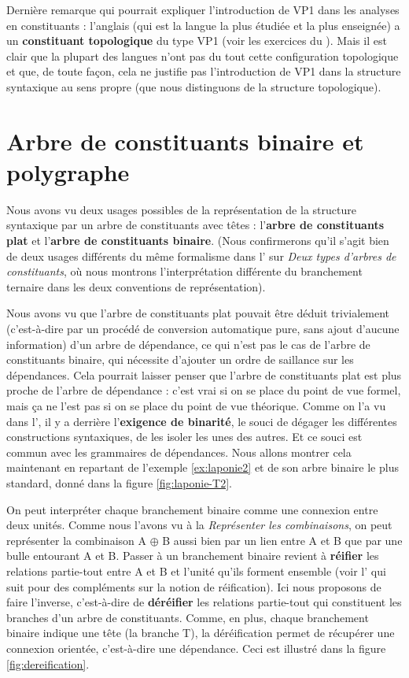 {    Dernière remarque qui pourrait expliquer l’introduction de VP1 dans les analyses en constituants : l’anglais (qui est la langue la plus étudiée et la plus enseignée) a un \textbf{constituant topologique} du type VP1 (voir les exercices du ). Mais il est clair que la plupart des langues n’ont pas du tout cette configuration topologique et que, de toute façon, cela ne justifie pas l’introduction de VP1 dans la structure syntaxique au sens propre (que nous distinguons de la structure topologique).
}
\section{Arbre de constituants binaire et polygraphe}\label{sec:3.4.21}

Nous avons vu deux usages possibles de la représentation de la structure syntaxique par un arbre de constituants avec têtes : l’\textbf{arbre de constituants plat} et l’\textbf{arbre de constituants binaire}. (Nous confirmerons qu’il s’agit bien de deux usages différents du même formalisme dans l’ sur \textit{Deux types d’arbres de constituants}, où nous montrons l’interprétation différente du branchement ternaire dans les deux conventions de représentation).

Nous avons vu que l’arbre de constituants plat pouvait être déduit trivialement (c’est-à-dire par un procédé de conversion automatique pure, sans ajout d’aucune information) d’un arbre de dépendance, ce qui n’est pas le cas de l’arbre de constituants binaire, qui nécessite d’ajouter un ordre de saillance sur les dépendances. Cela pourrait laisser penser que l’arbre de constituants plat est plus proche de l’arbre de dépendance : c’est vrai si on se place du point de vue formel, mais ça ne l’est pas si on se place du point de vue théorique. Comme on l’a vu dans l', il y a derrière l’\textbf{exigence de binarité}, le souci de dégager les différentes constructions syntaxiques, de les isoler les unes des autres. Et ce souci est commun avec les grammaires de dépendances. Nous allons montrer cela maintenant en repartant de l'exemple \ref{ex:laponie2} et de son arbre binaire le plus standard, donné dans la figure \ref{fig:laponie-T2}.

On peut interpréter chaque branchement binaire comme une connexion entre deux unités. Comme nous l’avons vu à la  \textit{Représenter les combinaisons}, on peut représenter la combinaison A ${\oplus}$ B aussi bien par un lien entre A et B que par une bulle entourant A et B. Passer à un branchement binaire revient à \textbf{réifier} les relations partie-tout entre A et B et l’unité qu’ils forment ensemble (voir l’ qui suit pour des compléments sur la notion de réification). Ici nous proposons de faire l’inverse, c’est-à-dire de \textbf{déréifier} les relations partie-tout qui constituent les branches d’un arbre de constituants. Comme, en plus, chaque branchement binaire indique une tête (la branche T), la déréification permet de récupérer une connexion orientée, c’est-à-dire une dépendance. Ceci est illustré dans la figure \ref{fig:dereification}.

